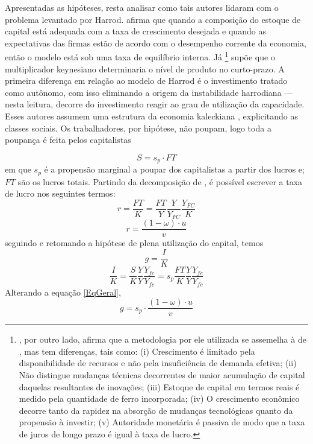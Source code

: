 Apresentadas as hipóteses, resta analisar como tais autores lidaram com o problema levantado por Harrod. \textcite{robinson_model_1962} afirma que quando a composição do estoque de capital está adequada com a taxa de crescimento desejada e quando as expectativas das firmas estão de acordo com o desempenho corrente da economia, então o modelo está sob uma taxa de equilíbrio interna. Já \textcite{kaldor_alternative_1955}\footnote{
	\textcite{kaldor_model_1957}, por outro lado, afirma que a metodologia por ele utilizada se assemelha à de \textcite{harrod_essay_1939}, mas tem diferenças, tais como: (i) Crescimento é limitado pela disponibilidade de recursos e não pela insuficiência de demanda efetiva; (ii) Não distingue mudanças técnicas decorrentes de maior acumulação de capital daquelas resultantes de inovações; (iii) Estoque de capital em termos reais é medido pela quantidade de ferro incorporada; (iv) O crescimento econômico decorre tanto da rapidez na absorção de mudanças tecnológicas quanto da propensão à investir; (v) Autoridade monetária é passiva de modo que a taxa de juros de longo prazo é igual à taxa de lucro.
} supõe que o multiplicador keynesiano determinaria o nível de produto no curto-prazo.
A primeira diferença em relação ao modelo de Harrod é o investimento tratado como autônomo, com isso eliminando a origem da instabilidade harrodiana --- nesta leitura, decorre do investimento reagir ao grau de utilização da capacidade. Esses autores assumem uma estrutura da economia kaleckiana \cite{kalecki_theory_1954}, explicitando as classes sociais. Os trabalhadores, por hipótese, não poupam, logo toda a poupança é feita pelos capitalistas

$$
S = s_p\cdot FT
$$
em que $s_p$ é a propensão marginal a poupar dos capitalistas a partir dos lucros e; $FT$ são os lucros totais. Partindo da decomposição de \textcite{weisskopf_marxian_1979}, é possível escrever a taxa de lucro nos seguintes termos:
$$
r = \frac{FT}{K} = \frac{FT}{Y}\frac{Y}{Y_{FC}}\frac{Y_{FC}}{K}
$$ 
\begin{equation}
\label{LucroCambridge}
r = \frac{(1-\omega)\cdot u}{v}
\end{equation}
seguindo \textcite{serrano_trouble_2017} e retomando a hipótese de plena utilização do capital, temos
$$
g = \frac{I}{K} 
$$
$$
\frac{I}{K} = \frac{S}{K}\frac{Y}{Y}\frac{Y_{fc}}{Y_{fc}} = s_p\frac{FT}{K}\frac{Y}{Y}\frac{Y_{fc}}{Y_{fc}}
$$
Alterando a equação \ref{EqGeral}, 
\begin{equation}
g = s_p\cdot \frac{(1-\omega)\cdot u}{v}
\end{equation}

